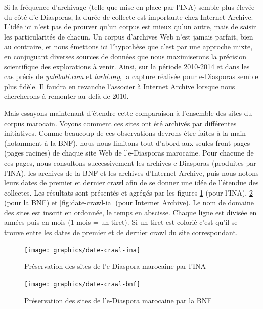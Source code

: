 \documentclass[symmetric,justified,marginals=raggedouter]{tufte-book}
\begin{document}
\noindent Si la fréquence d'archivage (telle que mise en place par l'INA) semble plus élevée du côté d'e-Diasporas, la durée de collecte est importante chez Internet Archive. L'idée ici n'est pas de prouver qu'un corpus est mieux qu'un autre, mais de saisir les particularités de chacun. Un corpus d'archives Web n'est jamais parfait, bien au contraire, et nous émettons ici l'hypothèse que c'est par une approche mixte, en conjuguant diverses sources de données que nous maximiserons la précision scientifique des explorations à venir. Ainsi, sur la période 2010-2014 et dans les cas précis de \textit{yabiladi.com} et \textit{larbi.org}, la capture réalisée pour e-Diasporas semble plus fidèle. Il faudra en revanche l'associer à Internet Archive lorsque nous chercherons à remonter au delà de 2010. 

Mais essayons maintenant d'étendre cette comparaison à l'ensemble des sites du corpus marocain. Voyons comment ces sites ont été archivés par différentes initiatives. Comme beaucoup de ces observations devrons être faites à la main (notamment à la BNF), nous nous limitons tout d'abord aux seules front pages (pages racines) de chaque site Web de l'e-Diasporas marocaine. Pour chacune de ces pages, nous consultons successivement les archives e-Diasporas (produites par l'INA), les archives de la BNF et les archives d'Internet Archive, puis nous notons leurs dates de premier et dernier crawl afin de se donner une idée de l'étendue des collectes. Les résultats sont présentés et agrégés par les figures \ref{fig:date-crawl-ina} (pour l'INA), \ref{fig:date-crawl-bnf} (pour la BNF) et \ref{fig:date-crawl-ia} (pour Internet Archive). Le nom de domaine des sites est inscrit en ordonnée, le temps en abscisse. Chaque ligne est divisée en années puis en mois (1 mois = un tiret). Si un tiret est colorié c'est qu'il se trouve entre les dates de premier et de dernier crawl du site correspondant.

\iffalse

\begin{figure}[hbtp]%
  \texttt{[image: graphics/date-crawl-ina]}
  \caption{Préservation des sites de l'e-Diaspora marocaine par l'INA}
  \label{fig:date-crawl-ina}
\end{figure}

\begin{figure}[hbtp]%
  \texttt{[image: graphics/date-crawl-bnf]}
  \caption{Préservation des sites de l'e-Diaspora marocaine par la BNF}
  \label{fig:date-crawl-bnf}
\end{figure}
\end{document}
